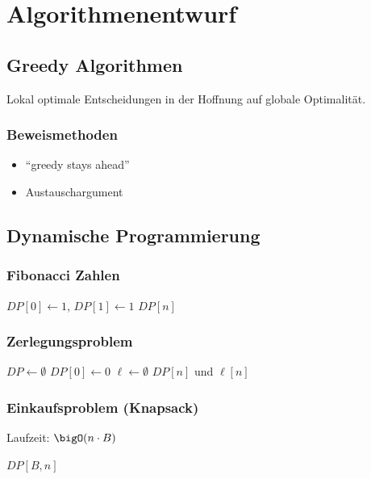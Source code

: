 \section*{Algorithmenentwurf}

\subsection*{Greedy Algorithmen}
Lokal optimale Entscheidungen in der Hoffnung auf globale Optimalität.

\subsubsection*{Beweismethoden}
\begin{itemize}
	\item \enquote{greedy stays ahead} 
	\item Austauschargument
\end{itemize}

\subsection*{Dynamische Programmierung}

\subsubsection*{Fibonacci Zahlen}
\begin{algorithm}[H]
	$DP[0] \gets 1$, $DP[1] \gets 1$\;
	\KwRet $DP[n]$\;
\end{algorithm}

\subsubsection*{Zerlegungsproblem}
\begin{algorithm}[H]
	$DP \gets \emptyset$\;
	$DP[0] \gets 0$\;
	$\ell \gets \emptyset$\;
	\KwRet $DP[n]$ und $\ell[n]$\;
\end{algorithm}

\subsubsection*{Einkaufsproblem (Knapsack)}
Laufzeit: $\bigO(n \cdot B)$

\begin{algorithm}[H]
	\KwRet $DP[B,n]$\;
\end{algorithm}
